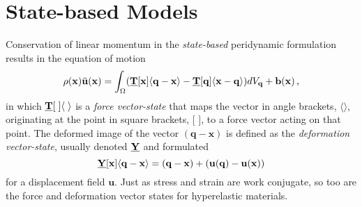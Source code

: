 \section{State-based Models}
Conservation of linear momentum in the \textit{state-based} peridynamic formulation results in the equation of motion
%
\begin{equation}
\label{eq:PDstateEoM}
\rho(\mathbf{x})\ddot{\mathbf{u}}(\mathbf{x}) = \int_\Omega (\vstate{T}{\mathbf{x}}{\mathbf{q}-\mathbf{x}}-\vstate{T}{\mathbf{q}}{\mathbf{x}-\mathbf{q}}) dV_\mathbf{q}  + \mathbf{b}(\mathbf{x})\, ,
\end{equation}
%
in which $\vstate{T}{\;}{\;}$ is a \textit{force vector-state} that maps the vector in angle brackets, $\langle \rangle$, originating at the point in square brackets, [ ], to a force vector acting on that point.
The deformed image of the vector $(\mathbf{q-x})$ is defined as the \textit{deformation vector-state}, usually denoted $\vstate{Y}{}{}$ and formulated 
%
\begin{equation}
\vstate{Y}{\mathbf{x}}{\mathbf{q}-\mathbf{x}} = (\mathbf{q}-\mathbf{x}) + (\mathbf{u}(\mathbf{q})-\mathbf{u}(\mathbf{x})) 
\end{equation}
%
for a displacement field \(\mathbf{u}\). 
Just as stress and strain are work conjugate, so too are the force and deformation vector states for hyperelastic materials.

